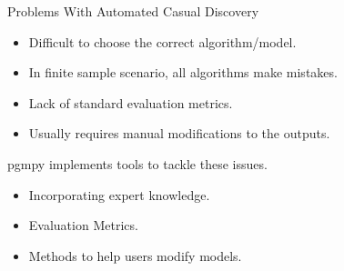 \documentclass{beamer}
\begin{document}
\begin{frame}{Problems With Automated Casual Discovery}
	\begin{itemize}
		\item Difficult to choose the correct algorithm/model.
		\item In finite sample scenario, all algorithms make mistakes.
		\item Lack of standard evaluation metrics.
		\item Usually requires manual modifications to the outputs.
	\end{itemize}

	\vspace{2em}

	pgmpy implements tools to tackle these issues. 
	\begin{itemize}
		\item Incorporating expert knowledge.
		\item Evaluation Metrics.
		\item Methods to help users modify models.
	\end{itemize}
\end{frame}
\end{document}
